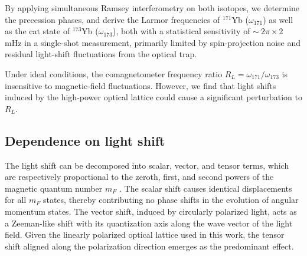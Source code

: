 \documentclass[pdflatex,sn-nature,centre]{sn-jnl}%
\begin{document}
By applying simultaneous Ramsey interferometry on both isotopes, we determine the precession phases, and derive the Larmor frequencies of $^{171}$Yb ($\omega_{171}$) as well as the cat state of $^{173}$Yb ($\omega_{173}$), both with a statistical sensitivity of $\sim\ 2\pi\times2$ mHz in a single-shot measurement, primarily limited by spin-projection noise and residual light-shift fluctuations from the optical trap.

Under ideal conditions, the comagnetometer frequency ratio $R_L = \omega_{171}/\omega_{173}$ is insensitive to magnetic-field fluctuations. However, we find that light shifts induced by the high-power optical lattice could cause a significant perturbation to $R_L$.


\subsection*{Dependence on light shift}



The light shift can be decomposed into scalar, vector, and tensor terms, which are respectively proportional to the zeroth, first, and second powers of the magnetic quantum number ${m_F}$ \cite{LeKien2013Polarizability}. The scalar shift causes identical displacements for all ${m_F}$ states, thereby contributing no phase shifts in the evolution of angular momentum states. The vector shift, induced by circularly polarized light, acts as a Zeeman-like shift with its quantization axis along the wave vector of the light field. Given the linearly polarized optical lattice used in this work, the tensor shift aligned along the polarization direction emerges as the predominant effect.
\end{document}

